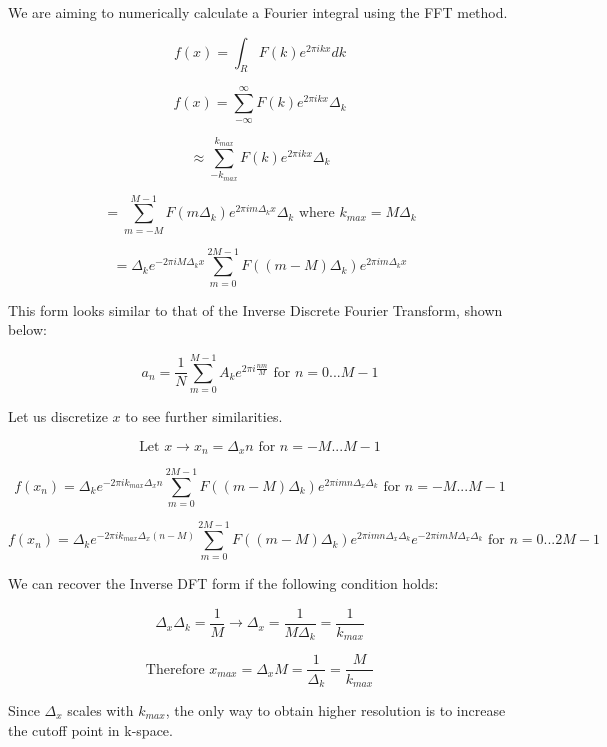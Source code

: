 \documentclass[letterpaper,11pt]{article}
\begin{document}
We are aiming to numerically calculate a Fourier integral using the FFT method.

\[f(x) = \int_R F(k) e^{2 \pi i k x} dk \]

\[ f(x) = \sum_{-\infty}^{\infty} F(k) e^{2 \pi i k x} \Delta_ k \]

\[ \approx \sum_{-k_{max}}^{k_{max}} F(k) e^{2 \pi i k x} \Delta_k \]

\[ = \sum_{m = -M}^{M-1} F(m \Delta_k) e^{2 \pi i m \Delta_k x} \Delta_k \text{ where } k_{max} = M \Delta_k \]

\[ = \Delta_k e^{-2 \pi i M \Delta_k x} \sum_{m=0}^{2M-1} F((m - M) \Delta_k) e^{2 \pi i m \Delta_k x} \]

This form looks similar to that of the Inverse Discrete Fourier Transform, shown below:

\[ a_n = \frac{1}{N} \sum_{m = 0}^{M-1} A_k e^{2 \pi i \frac{n m}{M}} \text{ for } n = 0 ... M - 1 \]

Let us discretize $x$ to see further similarities.

\[ \text{Let } x \rightarrow x_n = \Delta_x n \text{ for } n = -M ... M-1 \]

\[ f(x_n) = \Delta_k e^{-2 \pi i k_{max} \Delta_x n} \sum_{m = 0}^{2M-1} F((m - M) \Delta_k) e^{2 \pi i m n \Delta_x \Delta_k} \text{ for } n = -M ... M-1\]

\[ f(x_n) = \Delta_k e^{-2 \pi i k_{max} \Delta_x (n - M)} \sum_{m = 0}^{2M-1} F((m -M) \Delta_k) e^{2 \pi i m n \Delta_x \Delta_k} e^{-2 \pi i m M \Delta_x \Delta_k} \text{ for } n = 0 ... 2M - 1 \]

We can recover the Inverse DFT form if the following condition holds:

\[\Delta_x \Delta_k = \frac{1}{M} \rightarrow \Delta_x = \frac{1}{M \Delta_k} = \frac{1}{k_{max}} \]

\[ \text{Therefore } x_{max} = \Delta_x M = \frac{1}{\Delta_k} = \frac{M}{k_{max}} \]

Since $\Delta_x$ scales with $k_{max}$, the only way to obtain higher resolution is to increase the cutoff point in k-space.
\end{document}

